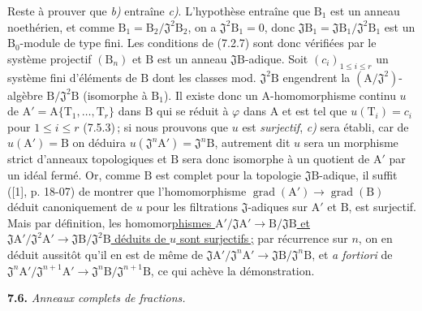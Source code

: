 Reste à prouver que \textit{b)} entraîne \textit{c)}. L’hypothèse entraîne que $\mathrm{B}_1$ est un anneau noethérien, et comme $\mathrm{B}_1=\mathrm{B}_2/\mathfrak{J}^2\mathrm{B}_2$, on a $\mathfrak{J}^2\mathrm{B}_1=0$, donc $\mathfrak{J}\mathrm{B}_1=\mathfrak{J}\mathrm{B}_1/\mathfrak{J}^2\mathrm{B}_1$ est un $\mathrm{B}_0$-module de type fini. Les conditions de (7.2.7) sont donc vérifiées par le système projectif $(\mathrm{B}_n)$ et $\mathrm{B}$ est un anneau $\mathfrak{J}\mathrm{B}$-adique. Soit $(c_i)_{1\leqslant i\leqslant r}$ un système fini d’éléments de $\mathrm{B}$ dont les classes mod. $\mathfrak{J}^2\mathrm{B}$ engendrent la $(\mathrm{A}/\mathfrak{J}^2)$-algèbre $\mathrm{B}/\mathfrak{J}^2\mathrm{B}$ (isomorphe à $\mathrm{B}_1$).
Il existe donc un $\mathrm{A}$-homomorphisme continu $u$ de $\mathrm{A}'=\mathrm{A}\{\mathrm{T}_1,\ldots,\mathrm{T}_r\}$ dans $\mathrm{B}$ qui se réduit à $\varphi$ dans $\mathrm{A}$ et est tel que $u(\mathrm{T}_i)=c_i$ pour $1\leqslant i\leqslant r$ (7.5.3)\,; si nous prouvons que $u$ est \textit{surjectif}, \textit{c)} sera établi, car de $u(\mathrm{A}')=\mathrm{B}$ on déduira $u(\mathfrak{J}^n\mathrm{A}')=\mathfrak{J}^n\mathrm{B}$, autrement dit $u$ sera un morphisme strict d’anneaux topologiques et $\mathrm{B}$ sera donc isomorphe à un quotient de $\mathrm{A}'$ par un idéal fermé. Or, comme $\mathrm{B}$ est complet pour la topologie $\mathfrak{J}\mathrm{B}$-adique, il suffit ([1], p. 18-07) de montrer que l’homomorphisme $\operatorname{grad}(\mathrm{A}')\to\operatorname{grad}(\mathrm{B})$ déduit canoniquement de $u$ pour les filtrations $\mathfrak{J}$-adiques sur $\mathrm{A}'$ et $\mathrm{B}$, est surjectif. Mais par définition, les homomor\uline{phismes $\mathrm{A}'/\mathfrak{J}\mathrm{A}'\to \mathrm{B}/\mathfrak{J}\mathrm{B}$ et $\mathfrak{J}\mathrm{A}'/\mathfrak{J}^2\mathrm{A}'\to \mathfrak{J}\mathrm{B}/\mathfrak{J}^2\mathrm{B}$ déduits de $u$ sont surjectifs\,;} \margin{\handwritten{!}} par récurrence sur $n$, on en déduit aussitôt qu’il en est de même de $\mathfrak{J}\mathrm{A}'/\mathfrak{J}^n\mathrm{A}'\to \mathfrak{J}\mathrm{B}/\mathfrak{J}^n\mathrm{B}$, et \textit{a fortiori} de $\mathfrak{J}^n\mathrm{A}'/\mathfrak{J}^{n+1}\mathrm{A}'\to \mathfrak{J}^n\mathrm{B}/\mathfrak{J}^{n+1}\mathrm{B}$, ce qui achève la démonstration.

\textbf{7.6.} \textit{Anneaux complets de fractions.}

